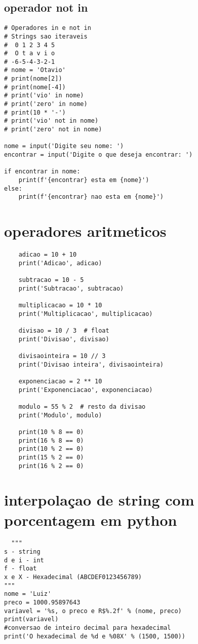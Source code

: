 \documentclass{article}
\begin{document}
  \subsection{operador not in}
\begin{lstlisting}
# Operadores in e not in
# Strings sao iteraveis
#  0 1 2 3 4 5
#  O t a v i o
# -6-5-4-3-2-1
# nome = 'Otavio'
# print(nome[2])
# print(nome[-4])
# print('vio' in nome)
# print('zero' in nome)
# print(10 * '-')
# print('vio' not in nome)
# print('zero' not in nome)

nome = input('Digite seu nome: ')
encontrar = input('Digite o que deseja encontrar: ')

if encontrar in nome:
    print(f'{encontrar} esta em {nome}')
else:
    print(f'{encontrar} nao esta em {nome}')
\end{lstlisting}
\section{operadores aritmeticos}
  \begin{lstlisting}
    adicao = 10 + 10
    print('Adicao', adicao)
    
    subtracao = 10 - 5
    print('Subtracao', subtracao)
    
    multiplicacao = 10 * 10
    print('Multiplicacao', multiplicacao)
    
    divisao = 10 / 3  # float
    print('Divisao', divisao)
    
    divisaointeira = 10 // 3
    print('Divisao inteira', divisaointeira)
    
    exponenciacao = 2 ** 10
    print('Exponenciacao', exponenciacao)
    
    modulo = 55 % 2  # resto da divisao
    print('Modulo', modulo)
    
    print(10 % 8 == 0)
    print(16 % 8 == 0)
    print(10 % 2 == 0)
    print(15 % 2 == 0)
    print(16 % 2 == 0)
  \end{lstlisting}
\section{interpolaçao de string com porcentagem em python}
\begin{lstlisting}
  """
s - string
d e i - int
f - float
x e X - Hexadecimal (ABCDEF0123456789)
"""
nome = 'Luiz'
preco = 1000.95897643
variavel = '%s, o preco e R$%.2f' % (nome, preco)
print(variavel)
#conversao de inteiro decimal para hexadecimal
print('O hexadecimal de %d e %08X' % (1500, 1500))

\end{lstlisting}
\end{document}
